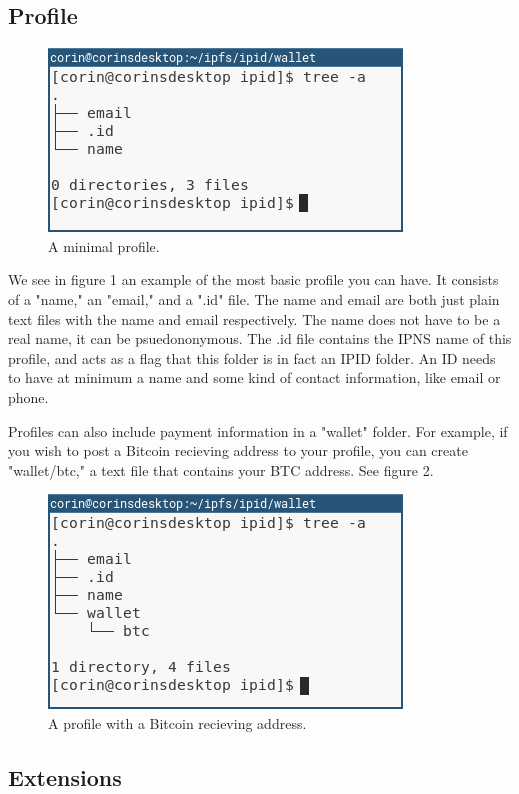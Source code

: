 \documentclass{article}
\begin{document}
\subsection{Profile}

\begin{figure}[h]
  \centering
  \includegraphics[width=.5\textwidth]{resources/basic_profile.png}
  \caption{A minimal profile.}
\end{figure}

We see in figure 1 an example of the most basic profile you can have. It consists of a "name," an "email," and a ".id" file. The name and email are both just plain text files with the name and email respectively. The name does not have to be a real name, it can be psuedononymous. The .id file contains the IPNS name of this profile, and acts as a flag that this folder is in fact an IPID folder. An ID needs to have at minimum a name and some kind of contact information, like email or phone. \par
Profiles can also include payment information in a "wallet" folder. For example, if you wish to post a Bitcoin recieving address to your profile, you can create "wallet/btc," a text file that contains your BTC address. See figure 2.

\begin{figure}[h]
  \centering
  \includegraphics[width=.5\textwidth]{resources/basic_profile_wallet.png}
  \caption{A profile with a Bitcoin recieving address.}
\end{figure}

\subsection{Extensions}
\end{document}
